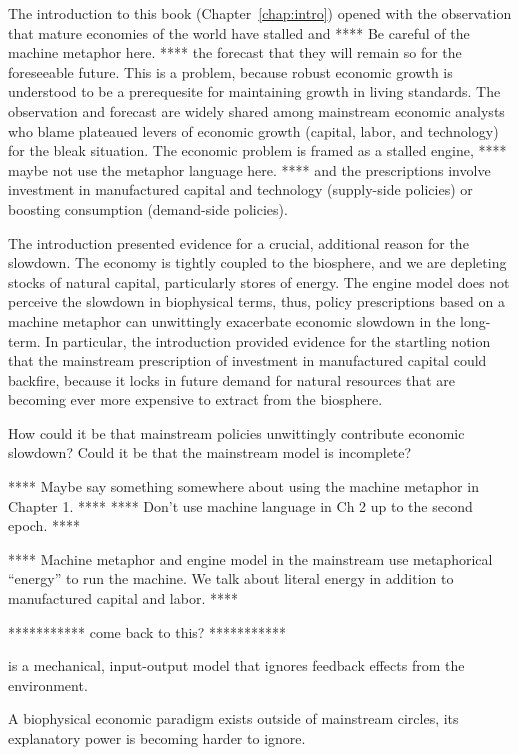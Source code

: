 The introduction to this book (Chapter~\ref{chap:intro}) opened with
the observation that mature economies of the world have stalled and
**** Be careful of the machine metaphor here. ****
the forecast that they will remain so for the foreseeable future. 
This is a problem, because robust economic growth is understood to be a prerequesite
for maintaining growth in living standards.
The observation and forecast are widely shared among mainstream economic analysts 
who blame plateaued levers of economic growth 
(capital, labor, and technology) for the bleak situation. 
The economic problem is framed as a stalled engine, 
**** maybe not use the metaphor language here. ****
and the prescriptions involve 
investment in manufactured capital and technology (supply-side policies) 
or boosting consumption (demand-side policies).

The introduction
presented evidence for a crucial, 
additional reason for the slowdown.
The economy is tightly coupled to the biosphere,
and we are depleting stocks of natural capital,
particularly stores of energy.
The engine model does not perceive the slowdown
in biophysical terms, 
thus, policy prescriptions based on a machine metaphor 
can unwittingly exacerbate economic slowdown in the long-term.
In particular, the introduction provided evidence 
for the startling notion that the mainstream prescription of 
investment in manufactured capital could backfire,
because it locks in future demand for natural resources 
that are becoming ever more expensive to extract from the biosphere.

How could it be that mainstream policies unwittingly contribute economic slowdown?
Could it be that the mainstream model is incomplete?

**** Maybe say something somewhere about using the machine metaphor in Chapter 1. ****
**** Don't use machine language in Ch 2 up to the second epoch. ****

**** Machine metaphor and engine model
in the mainstream use metaphorical ``energy'' to run the machine.
We talk about literal energy in addition to manufactured capital and labor. ****

*********** come back to this? ***********

is a mechanical, input-output model that ignores
feedback effects from the environment. 

A biophysical economic paradigm exists outside of
mainstream circles, 
its explanatory power is becoming harder to ignore.



